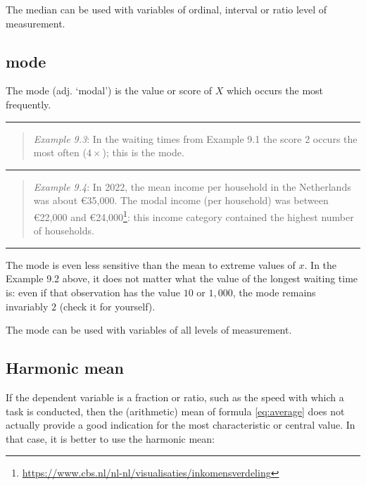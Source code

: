 \documentclass[
]{book}
\begin{document}
The median can be used with variables of ordinal, interval or ratio
level of measurement.

\subsection{mode}\label{mode}

The mode (adj. `modal') is the value or score of \(X\) which occurs
the most frequently.

\begin{center}\rule{0.5\linewidth}{0.5pt}\end{center}

\begin{quote}
\emph{Example 9.3}: In the waiting times from Example 9.1
the score 2 occurs the most often (\(4\times\)); this is the mode.
\end{quote}

\begin{center}\rule{0.5\linewidth}{0.5pt}\end{center}

\begin{quote}
\emph{Example 9.4}: In 2022, the mean income per household in the Netherlands was about €35,000.
The modal income (per household) was between €22,000 and €24,000\footnote{\url{https://www.cbs.nl/nl-nl/visualisaties/inkomensverdeling}}: this income category contained the highest number of households.
\end{quote}

\begin{center}\rule{0.5\linewidth}{0.5pt}\end{center}

The mode is even less sensitive than the mean to extreme values of
\(x\). In the Example 9.2 above, it does not matter what the value of
the longest waiting time is: even if that observation has the value \(10\) or
\(1,000\), the mode remains invariably \(2\) (check it for yourself).

The mode can be used with variables of all levels of measurement.

\subsection{Harmonic mean}\label{sec:harmonicmean}

If the dependent variable is a fraction or ratio,
such as the speed with which a task is conducted, then
the (arithmetic) mean of formula \eqref{eq:average} does
not actually provide a good indication for the
most characteristic or central value. In that case, it is better
to use the harmonic mean:
\end{document}
